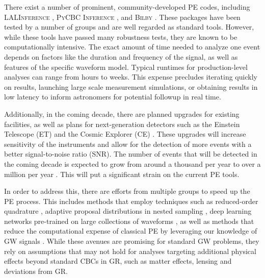 \documentclass[twocolumn]{aastex631}
\newcommand{\mi}[1]{\textsf{\color{teal}[\textbf{MI:} #1]}}
\begin{document}
There exist a number of prominent, community-developed PE codes, including
\textsc{LALInference} \citep{Veitch:2014wba}, \textsc{PyCBC Inference}
\citep{Biwer:2018osg}, and \textsc{Bilby}
\citep{Ashton:2018jfp,Romero-Shaw:2020owr}.  These packages have been tested by a
number of groups and are well regarded as standard tools. However, while these
tools have passed many robustness tests, they are known to be computationally
intensive. The exact amount of time needed to analyze one event depends on
factors like the duration and frequency of the signal, as well as features of
the specific waveform model. Typical runtimes for production-level analyses can
range from hours to weeks. This expense precludes iterating quickly on results,
launching large scale measurement simulations, or obtaining results in low
latency to inform astronomers for potential followup in real time.

Additionally, in the coming decade, there are planned upgrades for existing
facilities, as well as plans for next-generation detectors such as the Einstein
Telescope (ET) \citep{Punturo:2010zz} and the Cosmic Explorer (CE)
\citep{LIGOScientific:2016wof}. These upgrades will increase sensitivity of
the instruments and allow for the detection of more events with a better
signal-to-noise ratio (SNR). The number of events that will be detected in the
coming decade is expected to grow from around a thousand per year to over a
million per year \citep{Baibhav:2019gxm}. This will put a significant strain on
the current PE tools.

In order to address this, there are efforts from multiple groups to speed up the
PE process. This includes methods that employ techniques such as
reduced-order quadrature \citep{Canizares:2014fya,Smith:2016qas}, adaptive proposal distributions in nested sampling
\citep{Williams:2021qyt}, deep learning networks pre-trained on large collections
of waveforms \citep{Dax:2021tsq,Dax:2022pxd}, as well as methods that reduce the
computational expense of classical PE by leveraging our knowledge of GW signals
\citep{Veitch:2014wba,Ashton:2021anp,Cornish:2021wxy,Islam:2022afg,Roulet:2022kot,Lee:2022jpn,Lange:2018pyp,Wofford:2022ykb}.
While these avenues are promising for standard GW problems, they rely on
assumptions that may not hold for analyses targeting additional physical effects
beyond standard CBCs in GR, such as matter effects, lensing and deviations from GR.
\end{document}
